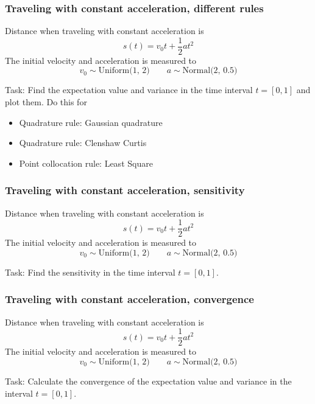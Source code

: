\documentclass{beamer}
\begin{document}
\begin{frame}
\frametitle{Traveling with constant acceleration, different rules}
 Distance when traveling with constant acceleration is
 \[s(t) = v_0t + \frac{1}{2}at^2\]
The initial velocity and acceleration is measured to
\[v_0 \sim \text{Uniform(1, 2)} \qquad a \sim \text{Normal(2, 0.5)}\]
\begin{alert}{Task:}
 Find the expectation value and variance in the time interval $t=[0,1]$ and plot them. Do this for 
 \begin{itemize}
  \item Quadrature rule: Gaussian quadrature
  \item Quadrature rule: Clenshaw Curtis
  \item Point collocation rule: Least Square
 \end{itemize}
\end{alert}
\end{frame}

\begin{frame}
\frametitle{Traveling with constant acceleration, sensitivity}
 Distance when traveling with constant acceleration is
 \[s(t) = v_0t + \frac{1}{2}at^2\]
The initial velocity and acceleration is measured to
\[v_0 \sim \text{Uniform(1, 2)} \qquad a \sim \text{Normal(2, 0.5)}\]
\begin{alert}{Task:}
 Find the sensitivity in the time interval $t=[0,1]$.
\end{alert}
\end{frame}

\begin{frame}
\frametitle{Traveling with constant acceleration, convergence}
 Distance when traveling with constant acceleration is
 \[s(t) = v_0t + \frac{1}{2}at^2\]
The initial velocity and acceleration is measured to
\[v_0 \sim \text{Uniform(1, 2)} \qquad a \sim \text{Normal(2, 0.5)}\]
\begin{alert}{Task:}
 Calculate the convergence of the expectation value and variance in the interval $t=[0,1]$.
\end{alert}
\end{frame}
\
  
\end{document}
